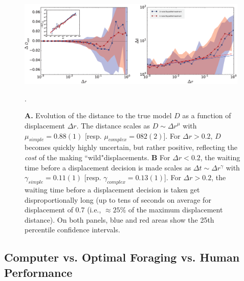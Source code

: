 \begin{figure}[h!]
\begin{center}
\includegraphics[width=11cm]{figures/vs_dr.eps}
\caption{{\bf A.} Evolution of the distance to the true model $D$ as a function of displacement $\Delta r$. The distance scales as $D \sim {\Delta r}^{\mu}$ with $\mu_{simple} = 0.88(1)$ [resp. $\mu_{complex} = 082(2)$]. For $\Delta r > 0.2$, $D$ becomes quickly highly uncertain, but rather positive, reflecting the {\it cost} of the making ``wild"displacements. {\bf B} For $\Delta r < 0.2$, the waiting time before a displacement decision is made scales as $\Delta t \sim \Delta r^{\gamma}$ with $\gamma_{simple} = 0.11(1)$ [resp. $\gamma_{complex} = 0.13(1)$]. For $\Delta r > 0.2$, the waiting time before a displacement decision is taken get disproportionally long (up to tens of seconds on average for displacement of 0.7 (i.e., $\approx 25\%$ of the maximum displacement distance). On both panels, blue and red areas show the 25th percentile confidence intervals.}.
\label{fig:vs_dr}
\end{center}
\end{figure}


\subsection{Computer vs. Optimal Foraging vs. Human Performance}

